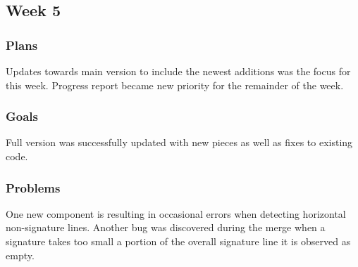 \documentclass[onecolumn, draftclsnofoot,10pt, compsoc]{IEEEtran}
\begin{document}
\subsection{Week 5}
\subsubsection{Plans}
Updates towards main version to include the newest additions was the focus for this week. Progress report became new priority for the remainder of the week.

\subsubsection{Goals}
Full version was successfully updated with new pieces as well as fixes to existing code. 

\subsubsection{Problems}
One new component is resulting in occasional errors when detecting horizontal non-signature lines. Another bug was discovered during the merge when a signature takes too small a portion of the overall signature line it is observed as empty.
\end{document}
